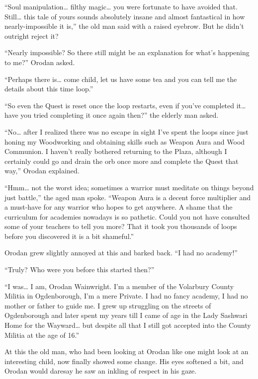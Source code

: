 \documentclass[a4paper,10pt]{book}
\begin{document}
“Soul manipulation… filthy magic… you were fortunate to have avoided that. Still… this tale of yours sounds absolutely insane and almost fantastical in how nearly-impossible it is,” the old man said with a raised eyebrow. But he didn’t outright reject it?\par
“Nearly impossible? So there still might be an explanation for what’s happening to me?” Orodan asked.\par
“Perhaps there is… come child, let us have some tea and you can tell me the details about this time loop.”\par
\par
“So even the Quest is reset once the loop restarts, even if you’ve completed it… have you tried completing it once again then?” the elderly man asked.\par
“No… after I realized there was no escape in sight I’ve spent the loops since just honing my Woodworking and obtaining skills such as Weapon Aura and Wood Communion. I haven’t really bothered returning to the Plaza, although I certainly could go and drain the orb once more and complete the Quest that way,” Orodan explained.\par
“Hmm… not the worst idea; sometimes a warrior must meditate on things beyond just battle,” the aged man spoke. “Weapon Aura is a decent force multiplier and a must-have for any warrior who hopes to get anywhere. A shame that the curriculum for academies nowadays is so pathetic. Could you not have consulted some of your teachers to tell you more? That it took you thousands of loops before you discovered it is a bit shameful.”\par
Orodan grew slightly annoyed at this and barked back. “I had no academy!”\par
“Truly? Who were you before this started then?”\par
“I was… I am, Orodan Wainwright. I’m a member of the Volarbury County Militia in Ogdenborough, I’m a mere Private. I had no fancy academy, I had no mother or father to guide me. I grew up struggling on the streets of Ogdenborough and later spent my years till I came of age in the Lady Sashwari Home for the Wayward… but despite all that I still got accepted into the County Militia at the age of 16.”\par
At this the old man, who had been looking at Orodan like one might look at an interesting child, now finally showed some change. His eyes softened a bit, and Orodan would daresay he saw an inkling of respect in his gaze.\par
\end{document}
